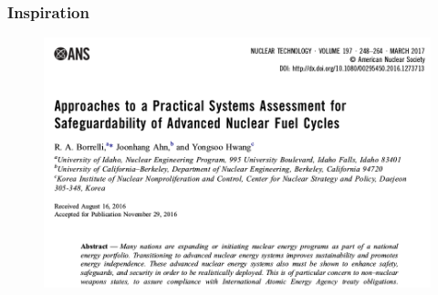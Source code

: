 \begin{frame}
\frametitle{Inspiration}
	\begin{figure}
		\centering
		\includegraphics[width=0.9\linewidth]{borrelli-citation.png}
	\end{figure}
\end{frame}

